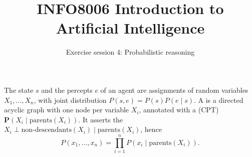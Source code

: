 \documentclass[11pt, a4paper]{exam}
\title{\bfseries INFO8006 Introduction to Artificial Intelligence}
\author{Exercise session 4: Probabilistic reasoning}
\date{}
\begin{document}
\maketitle

\begin{recap}
    The state $s$ and the percepts $e$ of an agent are assignments of random variables $X_1, \ldots, X_n$, with joint distribution $P(s, e) = P(s) P(e \mid s)$. A  is a directed acyclic graph with one node per variable $X_i$, annotated with a  (CPT) $\mathbf{P}(X_i \mid \text{parents}(X_i))$. It asserts the  $X_i \perp \text{non-descendants}(X_i) \mid \text{parents}(X_i)$, hence
    \[
        P(x_1, \ldots, x_n) = \prod_{i=1}^n P(x_i \mid \text{parents}(X_i)).
    \]


\end{recap}
\end{document}

